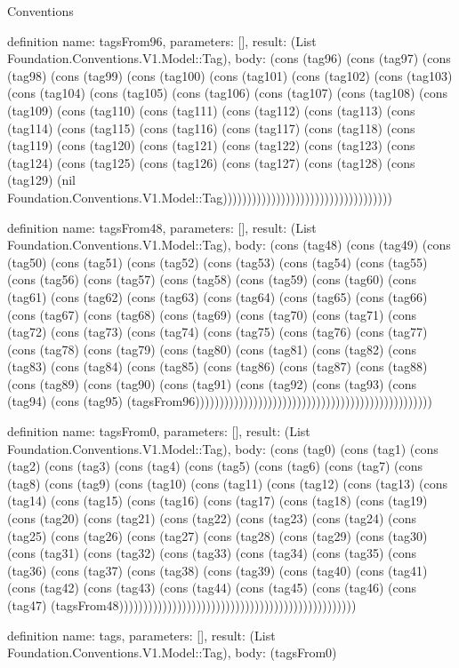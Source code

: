 \begin{lexlean}{Conventions}
\begin{semanticmodule}
definition{
  name: tagsFrom96,
  parameters: [],
  result: (List Foundation.Conventions.V1.Model::Tag),
  body: (cons (tag96) (cons (tag97) (cons (tag98) (cons (tag99) (cons (tag100) (cons (tag101) (cons (tag102) (cons (tag103) (cons (tag104) (cons (tag105) (cons (tag106) (cons (tag107) (cons (tag108) (cons (tag109) (cons (tag110) (cons (tag111) (cons (tag112) (cons (tag113) (cons (tag114) (cons (tag115) (cons (tag116) (cons (tag117) (cons (tag118) (cons (tag119) (cons (tag120) (cons (tag121) (cons (tag122) (cons (tag123) (cons (tag124) (cons (tag125) (cons (tag126) (cons (tag127) (cons (tag128) (cons (tag129) (nil Foundation.Conventions.V1.Model::Tag)))))))))))))))))))))))))))))))))))
}

definition{
  name: tagsFrom48,
  parameters: [],
  result: (List Foundation.Conventions.V1.Model::Tag),
  body: (cons (tag48) (cons (tag49) (cons (tag50) (cons (tag51) (cons (tag52) (cons (tag53) (cons (tag54) (cons (tag55) (cons (tag56) (cons (tag57) (cons (tag58) (cons (tag59) (cons (tag60) (cons (tag61) (cons (tag62) (cons (tag63) (cons (tag64) (cons (tag65) (cons (tag66) (cons (tag67) (cons (tag68) (cons (tag69) (cons (tag70) (cons (tag71) (cons (tag72) (cons (tag73) (cons (tag74) (cons (tag75) (cons (tag76) (cons (tag77) (cons (tag78) (cons (tag79) (cons (tag80) (cons (tag81) (cons (tag82) (cons (tag83) (cons (tag84) (cons (tag85) (cons (tag86) (cons (tag87) (cons (tag88) (cons (tag89) (cons (tag90) (cons (tag91) (cons (tag92) (cons (tag93) (cons (tag94) (cons (tag95) (tagsFrom96)))))))))))))))))))))))))))))))))))))))))))))))))
}

definition{
  name: tagsFrom0,
  parameters: [],
  result: (List Foundation.Conventions.V1.Model::Tag),
  body: (cons (tag0) (cons (tag1) (cons (tag2) (cons (tag3) (cons (tag4) (cons (tag5) (cons (tag6) (cons (tag7) (cons (tag8) (cons (tag9) (cons (tag10) (cons (tag11) (cons (tag12) (cons (tag13) (cons (tag14) (cons (tag15) (cons (tag16) (cons (tag17) (cons (tag18) (cons (tag19) (cons (tag20) (cons (tag21) (cons (tag22) (cons (tag23) (cons (tag24) (cons (tag25) (cons (tag26) (cons (tag27) (cons (tag28) (cons (tag29) (cons (tag30) (cons (tag31) (cons (tag32) (cons (tag33) (cons (tag34) (cons (tag35) (cons (tag36) (cons (tag37) (cons (tag38) (cons (tag39) (cons (tag40) (cons (tag41) (cons (tag42) (cons (tag43) (cons (tag44) (cons (tag45) (cons (tag46) (cons (tag47) (tagsFrom48)))))))))))))))))))))))))))))))))))))))))))))))))
}

definition{
  name: tags,
  parameters: [],
  result: (List Foundation.Conventions.V1.Model::Tag),
  body: (tagsFrom0)
}


\end{semanticmodule}
\end{lexlean}
